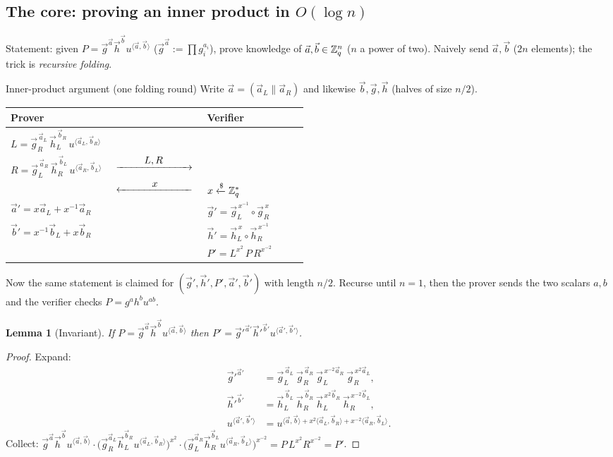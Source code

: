 \documentclass[11pt,a4paper]{report}
\makeatletter
\theoremstyle{plain}
\newtheorem{lemma}[theorem]{Lemma}
\theoremstyle{definition}
\theoremstyle{remark}
\newcommand{\getsr}{\xleftarrow{\$}}
\newcommand{\ra}[1]{\xrightarrow{\makebox[2.5cm]{$#1$}}}
\newcommand{\la}[1]{\xleftarrow{\makebox[2.5cm]{$#1$}}}
\newcommand{\inv}{^{-1}}
\newenvironment{flow}[2]{%
  \par\smallskip\noindent
  \begin{tabular}{@{}L{0.34\linewidth} c L{0.34\linewidth}@{}}
  \textbf{#1} & & \textbf{#2}\\ \hline}{\end{tabular}\par\smallskip}
\makeatother
\begin{document}
\subsection{The core: proving an inner product in \texorpdfstring{$O(\log n)$}{O(log n)}}
Statement: given $P=\vec g^{\vec a}\vec h^{\vec b}u^{\langle\vec a,\vec b\rangle}$ ($\vec g^{\vec a}:=\prod g_i^{a_i}$), prove knowledge of $\vec a,\vec b\in\mathbb{Z}_q^n$ ($n$ a power of two). Naively send $\vec a,\vec b$ ($2n$ elements); the trick is \emph{recursive folding}.
\begin{protocol}[label=pr:ipa]{Inner-product argument (one folding round)}
Write $\vec a=(\vec a_L\|\vec a_R)$ and likewise $\vec b,\vec g,\vec h$ (halves of size $n/2$). 
\begin{flow}{Prover}{Verifier}
$L=\vec g_R^{\,\vec a_L}\,\vec h_L^{\,\vec b_R}\,u^{\langle\vec a_L,\vec b_R\rangle}$ & & \\
$R=\vec g_L^{\,\vec a_R}\,\vec h_R^{\,\vec b_L}\,u^{\langle\vec a_R,\vec b_L\rangle}$ & $\ra{L,R}$ & \\
 & $\la{x}$ & $x\getsr\ZZ_q^*$\\
$\vec a'=x\vec a_L+x\inv\vec a_R$ & & $\vec g'=\vec g_L^{\,x\inv}\circ\vec g_R^{\,x}$\\
$\vec b'=x\inv\vec b_L+x\vec b_R$ & & $\vec h'=\vec h_L^{\,x}\circ\vec h_R^{\,x\inv}$\\
 & & $P'=L^{x^2}\,P\,R^{x^{-2}}$
\end{flow}
Now the same statement is claimed for $(\vec g',\vec h',P',\vec a',\vec b')$ with length $n/2$. Recurse until $n=1$, then the prover sends the two scalars $a,b$ and the verifier checks $P=g^ah^bu^{ab}$.
\end{protocol}
\begin{lemma}[Invariant]
If $P=\vec g^{\vec a}\vec h^{\vec b}u^{\langle\vec a,\vec b\rangle}$ then $P'=\vec g'^{\vec a'}\vec h'^{\vec b'}u^{\langle\vec a',\vec b'\rangle}$.
\end{lemma}
\begin{proof}
Expand:
\begin{align*}
\vec g'^{\vec a'}&=\vec g_L^{\,\vec a_L}\ \vec g_R^{\,\vec a_R}\ \vec g_L^{\,x^{-2}\vec a_R}\ \vec g_R^{\,x^2\vec a_L},\\
\vec h'^{\vec b'}&=\vec h_L^{\,\vec b_L}\ \vec h_R^{\,\vec b_R}\ \vec h_L^{\,x^2\vec b_R}\ \vec h_R^{\,x^{-2}\vec b_L},\\
u^{\langle\vec a',\vec b'\rangle}&=u^{\langle\vec a,\vec b\rangle+x^2\langle\vec a_L,\vec b_R\rangle+x^{-2}\langle\vec a_R,\vec b_L\rangle}.
\end{align*}
Collect: $\vec g^{\vec a}\vec h^{\vec b}u^{\langle\vec a,\vec b\rangle}\cdot\big(\vec g_R^{\vec a_L}\vec h_L^{\vec b_R}u^{\langle\vec a_L,\vec b_R\rangle}\big)^{x^2}\cdot\big(\vec g_L^{\vec a_R}\vec h_R^{\vec b_L}u^{\langle\vec a_R,\vec b_L\rangle}\big)^{x^{-2}}=P\,L^{x^2}R^{x^{-2}}=P'$.
\end{proof}
\end{document}
